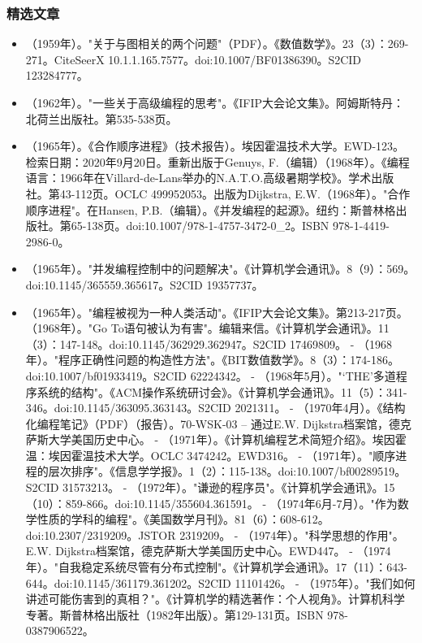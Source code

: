 \subsubsection{精选文章}
\begin{itemize}
\item （1959年）。"关于与图相关的两个问题"（PDF）。《数值数学》。23（3）：269-271。CiteSeerX 10.1.1.165.7577。doi:10.1007/BF01386390。S2CID 123284777。
\item （1962年）。"一些关于高级编程的思考"。《IFIP大会论文集》。阿姆斯特丹：北荷兰出版社。第535-538页。
\item （1965年）。《合作顺序进程》（技术报告）。埃因霍温技术大学。EWD-123。检索日期：2020年9月20日。重新出版于Genuys, F.（编辑）（1968年）。《编程语言：1966年在Villard-de-Lans举办的N.A.T.O.高级暑期学校》。学术出版社。第43-112页。OCLC 499952053。出版为Dijkstra, E.W.（1968年）。"合作顺序进程"。在Hansen, P.B.（编辑）。《并发编程的起源》。纽约：斯普林格出版社。第65-138页。doi:10.1007/978-1-4757-3472-0_2。ISBN 978-1-4419-2986-0。
\item （1965年）。"并发编程控制中的问题解决"。《计算机学会通讯》。8（9）：569。doi:10.1145/365559.365617。S2CID 19357737。
\item （1965年）。"编程被视为一种人类活动"。《IFIP大会论文集》。第213-217页。
（1968年）。"Go To语句被认为有害"。编辑来信。《计算机学会通讯》。11（3）：147-148。doi:10.1145/362929.362947。S2CID 17469809。
- （1968年）。"程序正确性问题的构造性方法"。《BIT数值数学》。8（3）：174-186。doi:10.1007/bf01933419。S2CID 62224342。
- （1968年5月）。"‘THE’多道程序系统的结构"。《ACM操作系统研讨会》。《计算机学会通讯》。11（5）：341-346。doi:10.1145/363095.363143。S2CID 2021311。
- （1970年4月）。《结构化编程笔记》（PDF）（报告）。70-WSK-03 – 通过E.W. Dijkstra档案馆，德克萨斯大学美国历史中心。
- （1971年）。《计算机编程艺术简短介绍》。埃因霍温：埃因霍温技术大学。OCLC 3474242。EWD316。
- （1971年）。"顺序进程的层次排序"。《信息学学报》。1（2）：115-138。doi:10.1007/bf00289519。S2CID 31573213。
- （1972年）。"谦逊的程序员"。《计算机学会通讯》。15（10）：859-866。doi:10.1145/355604.361591。
- （1974年6月-7月）。"作为数学性质的学科的编程"。《美国数学月刊》。81（6）：608-612。doi:10.2307/2319209。JSTOR 2319209。
- （1974年）。"科学思想的作用"。E.W. Dijkstra档案馆，德克萨斯大学美国历史中心。EWD447。
- （1974年）。"自我稳定系统尽管有分布式控制"。《计算机学会通讯》。17（11）：643-644。doi:10.1145/361179.361202。S2CID 11101426。
- （1975年）。"我们如何讲述可能伤害到的真相？"。《计算机学的精选著作：个人视角》。计算机科学专著。斯普林格出版社（1982年出版）。第129-131页。ISBN 978-0387906522。

\end{itemize}
